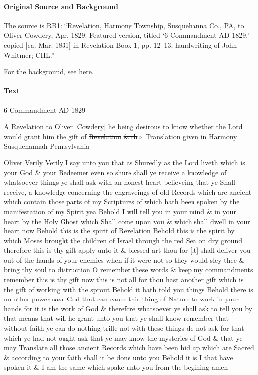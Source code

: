 			\paragraph{Original Source and Background}
			
				The source is RB1: ``Revelation, Harmony Township, Susquehanna Co., PA, to Oliver Cowdery, Apr. 1829. Featured version, titled `6 Commandment AD 1829,' copied [ca. Mar. 1831] in Revelation Book 1, pp. 12--13; handwriting of John Whitmer; CHL.''
				
				For the background, see \hyperref[DC8-HB]{here}.
			
			\paragraph{Text}
			
				\begin{tightcenter}
				6 Commandment AD 1829
				\end{tightcenter}
				
				A Revelation to Oliver [Cowdery] he being desirous to know whether the Lord would grant him the gift of \sout{Revelation} \sout{\& th$\diamond$} Translation given in Harmony Susquehannah Pennsylvania
				
				Oliver Verily Verily I say unto you that as Shuredly as the Lord liveth which is your God \& your Redeemer even so shure shall ye receive a knowledge of whatsoever things ye shall ask with an honest heart believeing that ye Shall receive, a knowledge concerning the engraveings of old Records which are ancient which contain those parts of my Scriptures of which hath been spoken by the manifestation of my Spirit yea Behold I will tell you in your mind \& in your heart by the Holy Ghost which Shall come upon you \& which shall dwell in your heart now Behold this is the spirit of Revelation Behold this is the spirit by which Moses brought the children of Israel through the red Sea on dry ground therefore this is thy gift apply unto it \& blessed art thou for [it] shall deliver you out of the hands of your enemies when if it were not so they would sley thee \& bring thy soul to distruction O remember these words \& keep my commandments remember this is thy gift now this is not all for thou hast another gift which is the gift of working with the sprout Behold it hath told you things Behold there is no other power save God that can cause this thing of Nature to work in your hands for it is the work of God \& therefore whatsoever ye shall ask to tell you by that means that will he grant unto you that ye shall know remember that without faith ye can do nothing trifle not with these things do not ask for that which ye had not ought ask that ye may know the mysteries of God \& that ye may Translate all those ancient Records which have been hid up which are Sacred \& according to your faith shall it be done unto you Behold it is I that have spoken it \& I am the same which spake unto you from the begining amen
			

